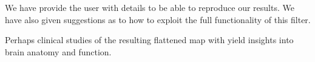 \documentclass{InsightArticle}
\begin{document}
	We have provide the user with details to be able to reproduce our
	results. We have also given suggestions as to how to exploit the
	full functionality of this filter.

	Perhaps clinical studies of the resulting flattened map with yield
	insights into brain anatomy and function.












\end{document}
